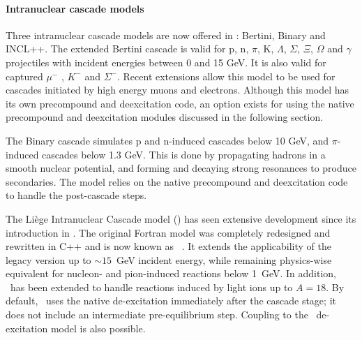 \paragraph{Intranuclear cascade models}
Three intranuclear cascade models are now offered in \Gfour{}: Bertini, Binary
and INCL++.  The extended Bertini cascade \cite{hadbib:bert} is valid for
p, n, $\pi$, K, $\Lambda$, $\Sigma$, $\Xi$, $\Omega$ and $\gamma$ projectiles
with incident energies between 0 and 15 GeV.  It is also valid for captured 
$\mu^-$ , $K^-$ and $\Sigma^-$.  Recent extensions allow this model to be used
for cascades initiated by high energy muons and electrons.  Although this model
has its own precompound and deexcitation code, an option exists for using the 
native \Gfour{} precompound and deexcitation modules discussed in the following
section.

The Binary cascade \cite{hadbib:binary} simulates p and n-induced cascades
below 10 GeV, and $\pi$-induced cascades below 1.3 GeV.  This is done by 
propagating hadrons in a smooth nuclear potential, and forming and decaying 
strong resonances to produce secondaries.  The model relies on the native 
\Gfour{} precompound and deexcitation code to handle the post-cascade steps. 

The Li\`ege Intranuclear Cascade model (\incl) \cite{hadbib:incl} has seen
extensive development since its introduction in \Gfour{}. The original Fortran 
model was completely redesigned and rewritten in C++ and is now known as 
\inclxx\ \cite{hadbib:inclxx}. It extends the applicability of the legacy 
version up to $\sim15$~GeV incident energy, while remaining physics-wise 
equivalent for nucleon- and pion-induced reactions below 1~GeV. In addition,
\inclxx\ has been extended to handle reactions induced by light ions up to
$A=18$.  By default, \inclxx\ uses the \Gfour{} native de-excitation immediately
after the cascade stage; it does not include an intermediate pre-equilibrium 
step.  Coupling to the \abla\ de-excitation model \cite{hadbib:ablav3} is also
possible.


